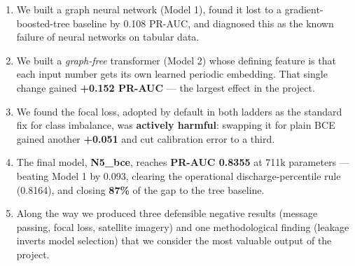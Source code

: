 \documentclass[11pt,a4paper]{article}
\begin{document}
\begin{enumerate}[leftmargin=*]
\item We built a graph neural network (Model 1), found it lost to a
gradient-boosted-tree baseline by 0.108 PR-AUC, and diagnosed this as the known
failure of neural networks on tabular data.

\item We built a \emph{graph-free} transformer (Model 2) whose defining feature
is that each input number gets its own learned periodic embedding. That single
change gained \textbf{+0.152 PR-AUC} --- the largest effect in the project.

\item We found the focal loss, adopted by default in both ladders as the standard
fix for class imbalance, was \textbf{actively harmful}: swapping it for plain BCE
gained another \textbf{+0.051} and cut calibration error to a third.

\item The final model, \textbf{N5\_bce}, reaches \textbf{PR-AUC 0.8355} at 711k
parameters --- beating Model 1 by 0.093, clearing the operational
discharge-percentile rule (0.8164), and closing \textbf{87\%} of the gap to the
tree baseline.

\item Along the way we produced three defensible negative results (message
passing, focal loss, satellite imagery) and one methodological finding (leakage
inverts model selection) that we consider the most valuable output of the
project.
\end{enumerate}
\end{document}
